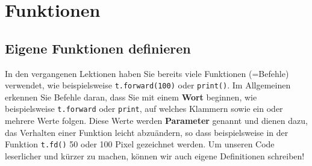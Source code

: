 \chapter{Funktionen}

\section{Eigene Funktionen  definieren}

In den vergangenen Lektionen haben Sie bereits viele Funktionen (=Befehle) verwendet, wie beispielsweise \lstinline|t.forward(100)| oder \lstinline|print()|. Im Allgemeinen erkennen Sie Befehle daran, dass Sie mit einem \textbf{Wort} beginnen, wie beispielsweise \lstinline|t.forward| oder \lstinline|print|, auf welches Klammern sowie ein oder mehrere Werte folgen. Diese Werte werden \textbf{Parameter} genannt und dienen dazu, das Verhalten einer Funktion leicht abzuändern, so dass beispielsweise in der Funktion \lstinline|t.fd()| 50 oder 100 Pixel gezeichnet werden. Um unseren Code leserlicher und kürzer zu machen, können wir auch eigene Definitionen schreiben!

